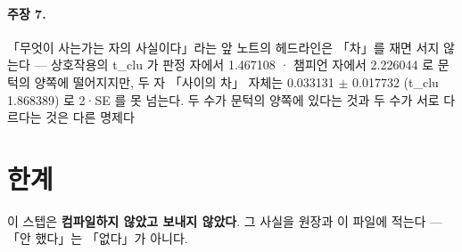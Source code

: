 \paragraph{주장 7.} 「무엇이 사는가는 자의 사실이다」라는 앞 노트의 헤드라인은 「차」를 재면 서지 않는다 --- 상호작용의 t\_clu 가 판정 자에서 1.467108 · 챔피언 자에서 2.226044 로 문턱의 양쪽에 떨어지지만, 두 자 「사이의 차」 자체는 0.033131 $\pm$ 0.017732 (t\_clu 1.868389) 로 2·SE 를 못 넘는다. 두 수가 문턱의 양쪽에 있다는 것과 두 수가 서로 다르다는 것은 다른 명제다


\section{한계}

이 스텝은 \textbf{컴파일하지 않았고 보내지 않았다}. 그 사실을 원장과 이 파일에 적는다 --- 「안 했다」는 「없다」가 아니다.
